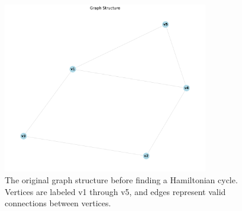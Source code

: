 \documentclass[a4paper,11pt]{article}
\begin{document}
\begin{figure}[htbp]
    \centering
    \includegraphics[width=0.8\textwidth]{../hamiltonian_cycle/problem-small_original.png}
    \caption{The original graph structure before finding a Hamiltonian cycle. Vertices are labeled v1 through v5, and edges represent valid connections between vertices.}
    \label{fig:original_graph}
\end{figure}
\end{document}
